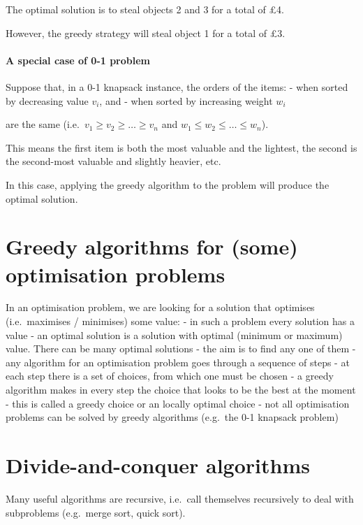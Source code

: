 \documentclass[11pt]{article}
\begin{document}
The optimal solution is to steal objects 2 and 3 for a total of
\pounds{}4.

However, the greedy strategy will steal object 1 for a total of
\pounds{}3.

    \paragraph{A special case of 0-1
problem}\label{a-special-case-of-0-1-problem}

Suppose that, in a 0-1 knapsack instance, the orders of the items: -
when sorted by decreasing value \(v_i\), and - when sorted by increasing
weight \(w_i\)

are the same (i.e.~\(v_1 \geq v_2 \geq \ldots \geq v_n\) and
\(w_1 \leq w_2 \leq \ldots \leq w_n\)).

This means the first item is both the most valuable and the lightest,
the second is the second-most valuable and slightly heavier, etc.

In this case, applying the greedy algorithm to the problem will produce
the optimal solution.

    \section{Greedy algorithms for (some) optimisation
problems}\label{greedy-algorithms-for-some-optimisation-problems}

In an optimisation problem, we are looking for a solution that optimises
(i.e.~maximises / minimises) some value: - in such a problem every
solution has a value - an optimal solution is a solution with optimal
(minimum or maximum) value. There can be many optimal solutions - the
aim is to find any one of them - any algorithm for an optimisation
problem goes through a sequence of steps - at each step there is a set
of choices, from which one must be chosen - a greedy algorithm makes in
every step the choice that looks to be the best at the moment - this is
called a greedy choice or an locally optimal choice - not all
optimisation problems can be solved by greedy algorithms (e.g.~the 0-1
knapsack problem)

    \section{Divide-and-conquer
algorithms}\label{divide-and-conquer-algorithms}

Many useful algorithms are recursive, i.e.~call themselves recursively
to deal with subproblems (e.g.~merge sort, quick sort).
\end{document}
